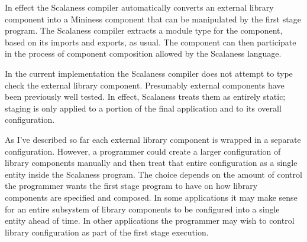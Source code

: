 In effect the Scalaness compiler automatically converts an external library component into a
Mininess component that can be manipulated by the first stage program. The Scalaness compiler
extracts a module type for the component, based on its imports and exports, as usual. The
component can then participate in the process of component composition allowed by the Scalaness
language.

In the current implementation the Scalaness compiler does not attempt to type check the external
library component. Presumably external components have been previously well tested. In effect,
Scalaness treats them as entirely static; staging is only applied to a portion of the final
application and to its overall configuration.


As I've described so far each external library component is wrapped in a separate configuration.
However, a programmer could create a larger configuration of library components manually and
then treat that entire configuration as a single entity inside the Scalaness program. The choice
depends on the amount of control the programmer wants the first stage program to have on how
library components are specified and composed. In some applications it may make sense for an
entire subsystem of library components to be configured into a single entity ahead of time. In
other applications the programmer may wish to control library configuration as part of the first
stage execution.

